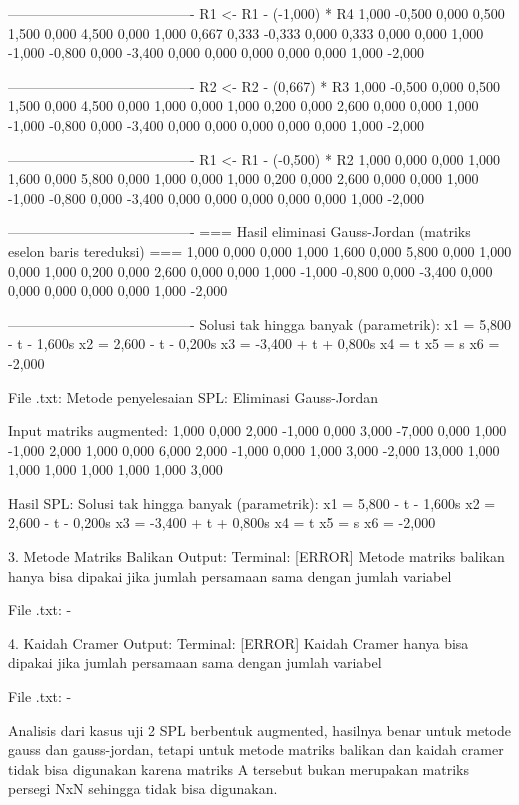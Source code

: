\documentclass[12pt]{article}
\begin{document}
\begin{enumerate}
\begin{keluaran}
----------------------------------------
R1 <- R1 - (-1,000) * R4
1,000   -0,500  0,000   0,500   1,500   0,000   4,500
0,000   1,000   0,667   0,333   -0,333  0,000   0,333
0,000   0,000   1,000   -1,000  -0,800  0,000   -3,400
0,000   0,000   0,000   0,000   0,000   1,000   -2,000

----------------------------------------
R2 <- R2 - (0,667) * R3
1,000   -0,500  0,000   0,500   1,500   0,000   4,500
0,000   1,000   0,000   1,000   0,200   0,000   2,600
0,000   0,000   1,000   -1,000  -0,800  0,000   -3,400
0,000   0,000   0,000   0,000   0,000   1,000   -2,000

----------------------------------------
R1 <- R1 - (-0,500) * R2
1,000   0,000   0,000   1,000   1,600   0,000   5,800
0,000   1,000   0,000   1,000   0,200   0,000   2,600
0,000   0,000   1,000   -1,000  -0,800  0,000   -3,400
0,000   0,000   0,000   0,000   0,000   1,000   -2,000

----------------------------------------
=== Hasil eliminasi Gauss-Jordan (matriks eselon baris tereduksi) ===
1,000   0,000   0,000   1,000   1,600   0,000   5,800
0,000   1,000   0,000   1,000   0,200   0,000   2,600
0,000   0,000   1,000   -1,000  -0,800  0,000   -3,400
0,000   0,000   0,000   0,000   0,000   1,000   -2,000

----------------------------------------
Solusi tak hingga banyak (parametrik):
x1 = 5,800 - t - 1,600s
x2 = 2,600 - t - 0,200s
x3 = -3,400 + t + 0,800s
x4 = t
x5 = s
x6 = -2,000

File .txt:
Metode penyelesaian SPL: Eliminasi Gauss-Jordan

Input matriks augmented:
1,000	0,000	2,000	-1,000	0,000	3,000	-7,000
0,000	1,000	-1,000	2,000	1,000	0,000	6,000
2,000	-1,000	0,000	1,000	3,000	-2,000	13,000
1,000	1,000	1,000	1,000	1,000	1,000	3,000

Hasil SPL:
Solusi tak hingga banyak (parametrik):
x1 = 5,800 - t - 1,600s
x2 = 2,600 - t - 0,200s
x3 = -3,400 + t + 0,800s
x4 = t
x5 = s
x6 = -2,000

3. Metode Matriks Balikan
Output:
Terminal:
[ERROR] Metode matriks balikan hanya bisa dipakai jika jumlah persamaan sama dengan jumlah variabel

File .txt:
-

4. Kaidah Cramer
Output:
Terminal:
[ERROR] Kaidah Cramer hanya bisa dipakai jika jumlah persamaan sama dengan jumlah variabel

File .txt:
-

\end{keluaran}
Analisis dari kasus uji 2 SPL berbentuk augmented, hasilnya benar untuk metode gauss dan gauss-jordan, tetapi untuk metode matriks balikan dan kaidah cramer tidak bisa digunakan karena matriks A tersebut bukan merupakan matriks persegi NxN sehingga tidak bisa digunakan.


\end{enumerate}
\end{document}
